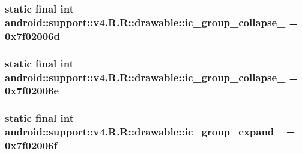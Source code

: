 \hypertarget{classandroid_1_1support_1_1v4_1_1_r_1_1drawable_5a0bfd4daf94ef1fbbb1bd8400dbc09a}{
\subsubsection[{ic\_\-group\_\-collapse\_\-14}]{\setlength{\rightskip}{0pt plus 5cm}static final int android::support::v4.R.R::drawable::ic\_\-group\_\-collapse\_ = 0x7f02006d}}
\label{classandroid_1_1support_1_1v4_1_1_r_1_1drawable_5a0bfd4daf94ef1fbbb1bd8400dbc09a}


\hypertarget{classandroid_1_1support_1_1v4_1_1_r_1_1drawable_472b8ac8761cff0c74a8d130396ac824}{
\subsubsection[{ic\_\-group\_\-collapse\_\-15}]{\setlength{\rightskip}{0pt plus 5cm}static final int android::support::v4.R.R::drawable::ic\_\-group\_\-collapse\_ = 0x7f02006e}}
\label{classandroid_1_1support_1_1v4_1_1_r_1_1drawable_472b8ac8761cff0c74a8d130396ac824}


\hypertarget{classandroid_1_1support_1_1v4_1_1_r_1_1drawable_e7a2870f8098ec3f941af43ce1220202}{
\subsubsection[{ic\_\-group\_\-expand\_\-00}]{\setlength{\rightskip}{0pt plus 5cm}static final int android::support::v4.R.R::drawable::ic\_\-group\_\-expand\_ = 0x7f02006f}}
\label{classandroid_1_1support_1_1v4_1_1_r_1_1drawable_e7a2870f8098ec3f941af43ce1220202}


